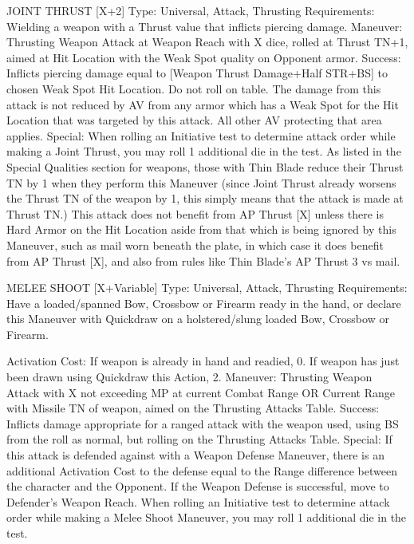 \documentclass[oneside,11pt,english]{book}
\begin{document}
 

JOINT THRUST [X+2] 
Type: Universal, Attack, Thrusting 
Requirements: Wielding a weapon with a Thrust value that inflicts piercing damage. 
Maneuver: Thrusting Weapon Attack at Weapon Reach with X dice, rolled at Thrust TN+1, aimed at Hit 
Location with the Weak Spot quality on Opponent armor. 
Success: Inflicts piercing damage equal to [Weapon Thrust Damage+Half STR+BS] to chosen Weak Spot 
Hit Location. Do not roll on table. The damage from this attack is not reduced by AV from any armor 
which has a Weak Spot for the Hit Location that was targeted by this attack. All other AV protecting that 
area applies. 
Special: When rolling an Initiative test to determine attack order while making a Joint Thrust, you may 
roll 1 additional die in the test. 
As listed in the Special Qualities section for weapons, those with Thin Blade reduce their Thrust TN by 1 
when they perform this Maneuver (since Joint Thrust already worsens the Thrust TN of the weapon by 1, 
this simply means that the attack is made at Thrust TN.) 
This attack does not benefit from AP Thrust [X] unless there is Hard Armor on the Hit Location aside 
from that which is being ignored by this Maneuver, such as mail worn beneath the plate, in which case it 
does benefit from AP Thrust [X], and also from rules like Thin Blade’s AP Thrust 3 vs mail. 

 

MELEE SHOOT [X+Variable] 
Type: Universal, Attack, Thrusting 
Requirements: Have a loaded/spanned Bow, Crossbow or Firearm ready in the hand, or declare this 
Maneuver with Quickdraw on a holstered/slung loaded Bow, Crossbow or Firearm. 


Activation Cost: If weapon is already in hand and readied, 0. If weapon has just been drawn using 
Quickdraw this Action, 2. 
Maneuver: Thrusting Weapon Attack with X not exceeding MP at current Combat Range OR Current 
Range with Missile TN of weapon, aimed on the Thrusting Attacks Table. 
Success: Inflicts damage appropriate for a ranged attack with the weapon used, using BS from the roll as 
normal, but rolling on the Thrusting Attacks Table. 
Special: If this attack is defended against with a Weapon Defense Maneuver, there is an additional 
Activation Cost to the defense equal to the Range difference between the character and the Opponent. If 
the Weapon Defense is successful, move to Defender’s Weapon Reach. 
When rolling an Initiative test to determine attack order while making a Melee Shoot Maneuver, you may 
roll 1 additional die in the test. 
\end{document}
